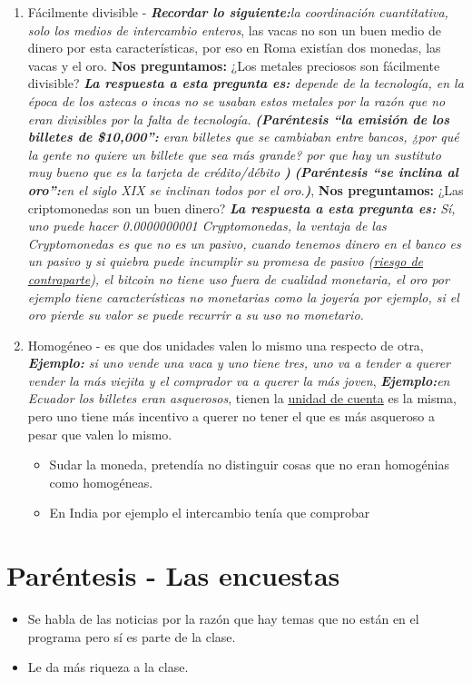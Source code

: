 \begin{enumerate}
    \item Fácilmente divisible - \emph{\textbf{Recordar lo siguiente:}la coordinación cuantitativa, solo los medios de intercambio enteros}, las vacas no son un buen medio de dinero por esta características, por eso en Roma existían dos monedas, las vacas y el oro. \textbf{Nos preguntamos:} ¿Los metales preciosos son fácilmente divisible? \emph{\textbf{La respuesta a esta pregunta es: }depende de la tecnología, en la época de los aztecas o incas no se usaban estos metales por la razón que no eran divisibles por la falta de tecnología.} \emph{\textbf{(Paréntesis ``la emisión de los billetes de \$10,000'':} eran billetes que se cambiaban entre bancos, ¿por qué la gente no quiere un billete que sea más grande? por que hay un sustituto muy bueno que es la tarjeta de crédito/débito \textbf{)}} \newline \emph{\textbf{(Paréntesis ``se inclina al oro'':}en el siglo XIX se inclinan todos por el oro.\textbf{)}}, \textbf{Nos preguntamos:} ¿Las criptomonedas son un buen dinero? \emph{\textbf{La respuesta a esta pregunta es: }Sí, uno puede hacer 0.0000000001 Cryptomonedas, la ventaja de las Cryptomonedas es que no es un pasivo, cuando tenemos dinero en el banco es un pasivo y si quiebra puede incumplir su promesa de pasivo (\underline{riesgo de contraparte}), el bitcoin no tiene uso fuera de cualidad monetaria, el oro por ejemplo tiene características no monetarias como la joyería por ejemplo, si el oro pierde su valor se puede recurrir a su uso no monetario.}
    
    \item Homogéneo - es que dos unidades valen lo mismo una respecto de otra, \emph{\textbf{Ejemplo:} si uno vende una vaca y uno tiene tres, uno va a tender a querer vender la más viejita y el comprador va a querer la más joven}, \emph{\textbf{Ejemplo:}en Ecuador los billetes eran asquerosos}, tienen la \underline{unidad de cuenta} es la misma, pero uno tiene más incentivo a querer no tener el que es más asqueroso a pesar que valen lo mismo.
        \begin{itemize}
            \item Sudar la moneda, pretendía no distinguir cosas que no eran homogénias como homogéneas.
            \item En India por ejemplo el intercambio tenía que comprobar 
        \end{itemize}
\end{enumerate}

\section{Paréntesis - Las encuestas}
\begin{itemize}
    \item Se habla de las noticias por la razón que hay temas que no están en el programa pero sí es parte de la clase.
    \item Le da más riqueza a la clase.
\end{itemize}
